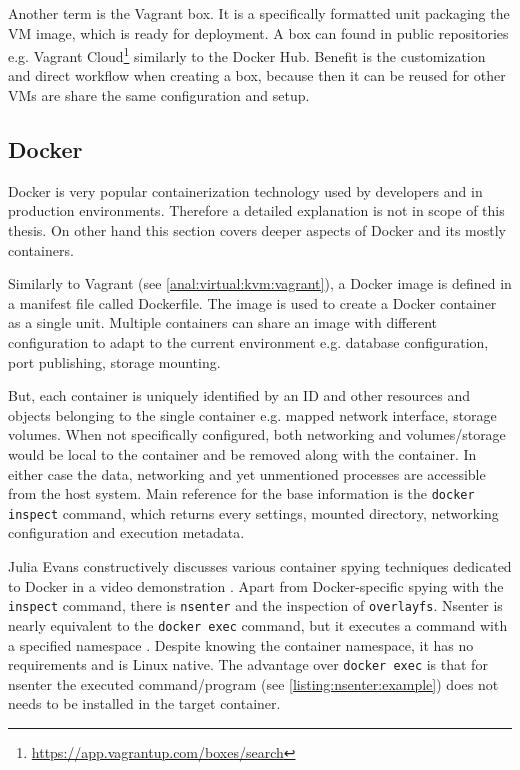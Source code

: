 Another term is the Vagrant box. It is a specifically formatted unit packaging the VM image, which is ready for deployment. A box can found in public repositories e.g. Vagrant Cloud\footnote{\url{https://app.vagrantup.com/boxes/search}} similarly to the Docker Hub. Benefit is the customization and direct workflow when creating a box, because then it can be reused for other VMs are share the same configuration and setup.

\subsection{Docker \label{anal:virtual:docker}}
Docker is very popular containerization technology used by developers and in production environments. Therefore a detailed explanation is not in scope of this thesis. On other hand this section covers deeper aspects of Docker and its mostly containers.

Similarly to Vagrant (see \autoref{anal:virtual:kvm:vagrant}), a Docker image is defined in a manifest file called Dockerfile. The image is used to create a Docker container as a single unit. Multiple containers can share an image with different configuration to adapt to the current environment e.g. database configuration, port publishing, storage mounting. 

But, each container is uniquely identified by an ID and other resources and objects belonging to the single container e.g. mapped network interface, storage volumes. When not specifically configured, both networking and volumes/storage would be local to the container and be removed along with the container. In either case the data, networking and yet unmentioned processes are accessible from the host system. Main reference for the base information is the \texttt{docker inspect} command, which returns every settings, mounted directory, networking configuration and execution metadata.

Julia Evans constructively discusses various container spying techniques dedicated to Docker in a video demonstration \cite{video:docker:spying}. Apart from Docker-specific spying with the \texttt{inspect} command, there is \texttt{nsenter} and the inspection of \texttt{overlayfs}. Nsenter is nearly equivalent to the \texttt{docker exec} command, but it executes a command with a specified namespace \cite{man:nsenter}. Despite knowing the container namespace, it has no requirements and is Linux native. The advantage over \texttt{docker exec} is that for nsenter the executed command/program (see \autoref{listing:nsenter:example}) does not needs to be installed in the target container.

